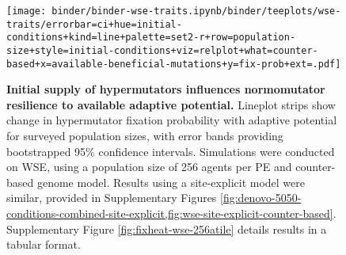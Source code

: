 \begin{figure}[h]
\begin{minipage}{0.6\textwidth}
  \texttt{[image: binder/binder-wse-traits.ipynb/binder/teeplots/wse-traits/errorbar=ci+hue=initial-conditions+kind=line+palette=set2-r+row=population-size+style=initial-conditions+viz=relplot+what=counter-based+x=available-beneficial-mutations+y=fix-prob+ext=.pdf]}%
\end{minipage}%
\begin{minipage}{0.4\textwidth}
  \caption{
  \textbf{Initial supply of hypermutators influences normomutator resilience to available adaptive potential.}
  \footnotesize
  Lineplot strips show change in hypermutator fixation probability with adaptive potential for surveyed population sizes, with error bands providing bootstrapped 95\% confidence intervals.
  Simulations were conducted on WSE, using a population size of 256 agents per PE and counter-based genome model.
  Results using a site-explicit model were similar, provided in Supplementary Figures \cref{fig:denovo-5050-conditions-combined-site-explicit,fig:wse-site-explicit-counter-based}.
  Supplementary Figure \ref{fig:fixheat-wse-256atile} details results in a tabular format.
    }
    \label{fig:denovo-5050-conditions-combined}
  \end{minipage}
\end{figure}
